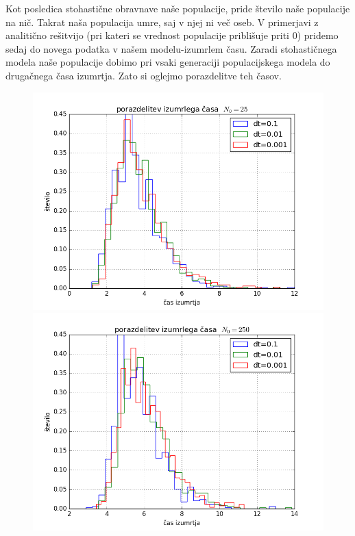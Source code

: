 \documentclass[slovene,11pt,a4paper]{article}
\numberwithin{equation}{section} %
\numberwithin{figure}{section} %
\numberwithin{table}{section} %
\begin{document}
Kot posledica stohastične obravnave naše populacije, pride število naše  populacije na nič. Takrat naša populacija umre, saj v njej ni več oseb. V primerjavi z analitično rešitvijo (pri kateri se vrednost populacije priblišuje priti 0) pridemo sedaj do novega podatka v našem modelu-izumrlem času. Zaradi stohastičnega modela naše populacije dobimo pri vsaki generaciji populacijskega modela do drugačnega časa izumrtja. Zato si oglejmo porazdelitve teh časov.



\begin{figure}[h]
\centering
\begin{minipage}{0.5\textwidth}
\centering
\includegraphics[scale=0.45]{slike/porazdelitev_umrlicas_25.png}
\end{minipage}\hfill
\begin{minipage}{0.5\textwidth}
\centering
\includegraphics[scale=0.45]{slike/porazdelitev_umrlicas_250.png}
\end{minipage}


\end{figure}
\end{document}
